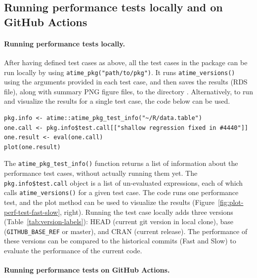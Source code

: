 \subsection{Running performance tests locally and on GitHub Actions}

\paragraph{Running performance tests locally.}
After having defined test cases as above, all the test cases in the package can be run locally by using \verb|atime_pkg("path/to/pkg")|.
It runs \verb|atime_versions()| using the arguments provided in each test case, and then saves the results (RDS file), along with summary PNG figure files, to the directory .
Alternatively, to run and visualize the results for a single test case, the code below can be used.
\begin{Schunk}
\begin{verbatim}
pkg.info <- atime::atime_pkg_test_info("~/R/data.table")
one.call <- pkg.info$test.call[["shallow regression fixed in #4440"]] 
one.result <- eval(one.call) 
plot(one.result)
\end{verbatim}    
\end{Schunk}
The \verb|atime_pkg_test_info()| function returns a list of information about the performance test cases, without actually running them yet.
The \verb|pkg.info$test.call| object is a list of un-evaluated expressions, each of which calls \verb|atime_versions()| for a given test case.
The code  runs one performance test, and the plot method can be used to visualize the results (Figure~\ref{fig:plot-perf-test-fast-slow}, right).
Running the test case locally adds three versions (Table~\ref{tab:version-labels}): HEAD (current git version in local clone), base (\verb|GITHUB_BASE_REF| or master), and CRAN (current release).
The performance of these versions can be compared to the historical commits (Fast and Slow) to evaluate the performance of the current code.

\paragraph{Running performance tests on GitHub Actions.}

